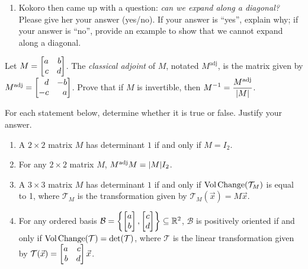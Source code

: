 \begin{exercises}
\begin{problist}
\begin{enumerate}
			\item Kokoro then came up with a question: \emph{can we expand along
				a diagonal?} Please give her your answer (yes/no). If your answer
				is ``yes'', explain why; if your answer is ``no'', provide an
				example to show that we cannot expand along a diagonal.
		\end{enumerate}
		\prob Let $M=\mat{a & b \\ c & d}$. The \emph{classical adjoint} of $M$,
		notated $M^{\text{adj}}$, is the matrix given by $M^{\text{adj}}=\mat{d & -b \\ -c & a}$.
		Prove that if $M$ is invertible, then $\displaystyle M^{-1}=\frac{M^{\text{adj}}}{\lvert M\rvert}$.

		\prob For each statement below, determine whether it is true or false. Justify
		your answer.
		\begin{enumerate}
			\item A $2\times 2$ matrix $M$ has determinant $1$ if and only if $M=
				I_{2}$.

			\item For any $2\times 2$ matrix $M$, $M^{\text{adj}}M=\lvert M\rvert I_{2}$.

			\item A $3\times 3$ matrix $M$ has determinant $1$ if and only if $\operatorname{Vol\hspace{1.5pt}Change}
				(\mathcal{T}_{M})$ is equal to 1, where $\mathcal{T}_{M}$ is the
				transformation given by $\mathcal{T}_{M}(\vec x)=M\vec x$.

			\item For any ordered basis $\mathcal{B}=\left\{\begin{bmatrix}a \\ b\end{bmatrix},\begin{bmatrix}c \\ d\end{bmatrix}
				\right\}\subseteq \mathbb{R}^{2}$, $\mathcal{B}$ is positively
				oriented if and only if
				$\operatorname{Vol\hspace{1.5pt}Change}(\mathcal{T})=\det(\mathcal{T})$, where $\mathcal{T}$
				is the linear transformation given by $\mathcal{T}(\vec x)=\mat{a & c \\ b & d}
				\vec x$.
		\end{enumerate}
	\end{problist}
\end{exercises}
